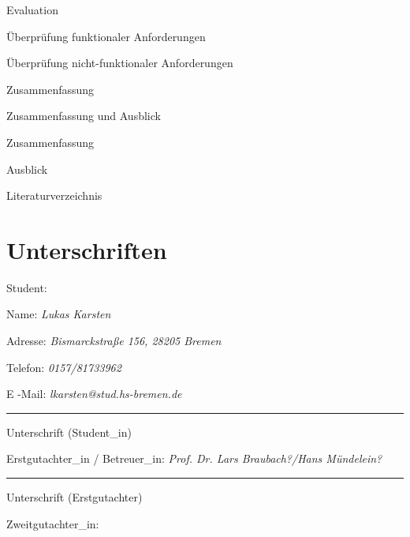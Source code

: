 \documentclass[11pt]{scrartcl}
\begin{document}
\begin{gliederung}
	\item Evaluation
	\begin{gliederung}
		\item Überprüfung funktionaler Anforderungen
		\item Überprüfung nicht-funktionaler Anforderungen
		\item Zusammenfassung
	\end{gliederung}

	\item Zusammenfassung und Ausblick
	\begin{gliederung}
		\item Zusammenfassung
		\item Ausblick
	\end{gliederung}

\end{gliederung}

{\parindent=5mm
Literaturverzeichnis}%
\medskip    %

\pagebreak

\section{Unterschriften}

Student:

 Name: \textit{Lukas Karsten}
 
 Adresse: \textit{Bismarckstraße 156, 28205 Bremen}
 
 Telefon: \textit{0157/81733962}
  
 E -Mail: \textit{lkarsten@stud.hs-bremen.de}


 \hfill \rule{7cm}{0.2mm}

 \hfill Unterschrift (Student\_in)
 
\noindent
Erstgutachter\_in / Betreuer\_in: \textit{ Prof. Dr. Lars Braubach?/Hans Mündelein? } \\[0.2cm]

 \hfill \rule{7cm}{0.2mm}

 \hfill Unterschrift (Erstgutachter)


\noindent
Zweitgutachter\_in: \textit{}




% 
%
%
% 



\printbibheading
\printbibliography[nottype=online, heading=subbibliography, title={Gedruckte Quellen}]
\printbibliography[type=online, heading=subbibliography, title={Online Quellen}]
\end{document}

